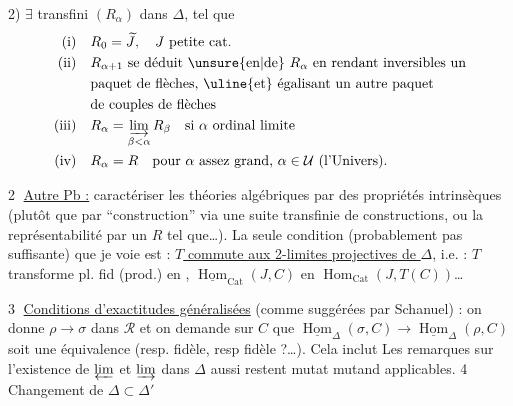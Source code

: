 2)  $\exists$   transfini $(R_\alpha)$ dans $\Delta$, tel que
\[
 \begin{aligned}
 \text{(i)}\quad &R_0=\widetilde J,\quad J\text{ petite cat.}\\
 \text{(ii)}\quad &R_{\alpha+1}\text{ se déduit \unsure{en|de} $R_\alpha$ en rendant inversibles un}\\
 &\text{paquet de flèches, \uline{et} égalisant un autre paquet}\\
 &\text{de couples de flèches}\\
 \text{(iii)}\quad &R_\alpha=\varinjlim_{\beta<\alpha}R_\beta\quad\text{si $\alpha$ ordinal limite}\\
 \text{(iv)}\quad &R_\alpha=R\quad\text{pour $\alpha$ assez grand, $\alpha\in\mathcal U$ (l'Univers).}
 \end{aligned}
\]

\textcircled{2} \uline{Autre Pb :} caractériser les théories algébriques par des propriétés intrinsèques (plutôt que par ``construction'' via une suite transfinie de constructions, ou la représentabilité par un $R$ tel que\ldots).
La seule condition (probablement pas suffisante) que je voie est : \uline{$T$ commute aux 2-limites projectives de $\Delta$}, i.e. : $T$ transforme   pl. fid (prod.) en , $\underline{\operatorname{Hom}}_{\mathrm{Cat}}(J,C)$ en $\operatorname{Hom}_{\mathrm{Cat}}(J,T(C))$\ldots

\textcircled{3} \uline{Conditions  d'exactitudes généralisées} (comme suggérées par Schanuel) : on donne  $\rho\to\sigma$ dans $\mathcal R$ et on demande sur $C$ que $\underline{\operatorname{Hom}}_\Delta(\sigma,C)\to\underline{\operatorname{Hom}}_\Delta(\rho,C)$ soit une équivalence (resp.  fidèle, resp fidèle ?\ldots). Cela inclut  Les remarques sur l'existence de $\varprojlim$ et $\varinjlim$ dans $\Delta$ aussi restent mutat mutand applicables.
\textcircled{4} Changement de $\Delta\subset\Delta'$


